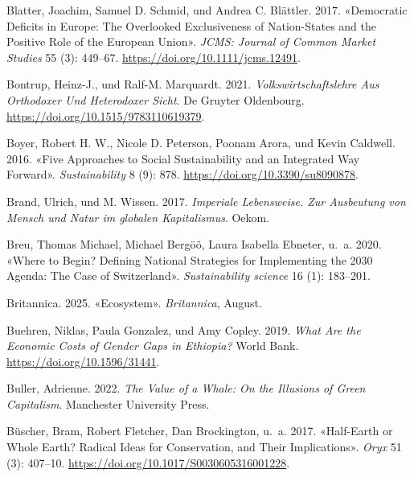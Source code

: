 \documentclass[
  nswissgerman,
  a4paper,
  openany]{book}
\newlength{\cslhangindent}
\newenvironment{CSLReferences}[2] %
 {\begin{list}{}{%
  \setlength{\itemindent}{0pt}
  \setlength{\leftmargin}{0pt}
  \setlength{\parsep}{0pt}
  \ifodd #1
   \setlength{\leftmargin}{\cslhangindent}
   \setlength{\itemindent}{-1\cslhangindent}
  \fi
  \setlength{\itemsep}{#2\baselineskip}}}
 {\end{list}}
\begin{document}
\begin{CSLReferences}{1}{1}
Blatter, Joachim, Samuel D. Schmid, und Andrea C. Blättler. 2017.
{«Democratic {Deficits} in {Europe}: {The Overlooked Exclusiveness} of
{Nation-States} and the {Positive Role} of the {European Union}»}.
\emph{JCMS: Journal of Common Market Studies} 55 (3): 449--67.
\url{https://doi.org/10.1111/jcms.12491}.

Bontrup, Heinz-J., und Ralf-M. Marquardt. 2021.
\emph{Volkswirtschaftslehre Aus Orthodoxer Und Heterodoxer {Sicht}}. De
Gruyter Oldenbourg. \url{https://doi.org/10.1515/9783110619379}.

Boyer, Robert H. W., Nicole D. Peterson, Poonam Arora, und Kevin
Caldwell. 2016. {«Five {Approaches} to {Social Sustainability} and an
{Integrated Way Forward}»}. \emph{Sustainability} 8 (9): 878.
\url{https://doi.org/10.3390/su8090878}.

Brand, Ulrich, und M. Wissen. 2017. \emph{Imperiale {Lebensweise}. {Zur}
{Ausbeutung} von {Mensch} und {Natur} im globalen {Kapitalismus}}.
Oekom.

Breu, Thomas Michael, Michael Bergöö, Laura Isabella Ebneter, u.~a.
2020. {«Where to Begin? {Defining} National Strategies for Implementing
the 2030 {Agenda}: The Case of {Switzerland}»}. \emph{Sustainability
science} 16 (1): 183--201.

Britannica. 2025. {«Ecosystem»}. \emph{Britannica}, August.

Buehren, Niklas, Paula Gonzalez, und Amy Copley. 2019. \emph{What {Are}
the {Economic Costs} of {Gender Gaps} in {Ethiopia}?} World Bank.
\url{https://doi.org/10.1596/31441}.

Buller, Adrienne. 2022. \emph{The {Value} of a {Whale}: {On} the
{Illusions} of {Green Capitalism}}. Manchester University Press.

Büscher, Bram, Robert Fletcher, Dan Brockington, u.~a. 2017.
{«Half-{Earth} or {Whole Earth}? {Radical} Ideas for Conservation, and
Their Implications»}. \emph{Oryx} 51 (3): 407--10.
\url{https://doi.org/10.1017/S0030605316001228}.


\end{CSLReferences}
\end{document}
